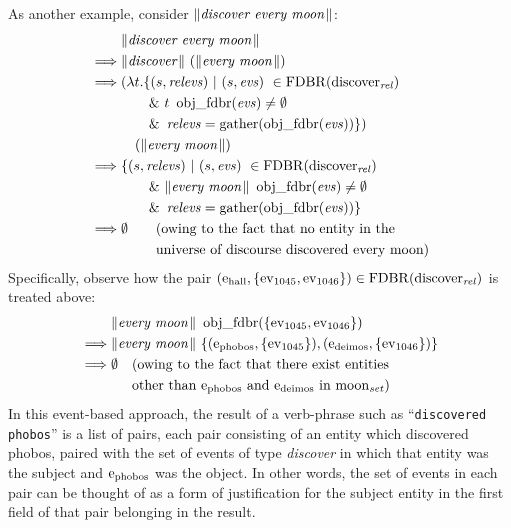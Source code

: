 \documentclass[../main.tex]{subfiles}
\begin{document}
\begin{refsection}
As another example, consider $\lVert\textit{discover every moon\hspace{0.1em}}\rVert$:
\begin{equation*}
	\begin{split}
		& \meaningof{discover every moon} \\
		\implies & \meaningof{discover}\ (\meaningof{every moon}) \\
		\implies & (\lambda t.\{(s, \opit{relevs})\ |\ (s, \evs)\ \in \FDBR{\relation{discover}}\ \\
		& \qquad \&\ t\ \objfdbr{\evs} \neq \emptyset  \\
		& \qquad \&\ \opit{relevs} = \gatherevs{\objfdbr{\evs}}\})\ \\
		& \quad (\meaningof{every moon}) \\
		\implies & \{(s, \opit{relevs})\ |\ (s, \evs)\ \in \FDBR{\relation{discover}}\ \\
		& \qquad \&\ \meaningof{every moon}\ \objfdbr{\evs} \neq \emptyset \\
		& \qquad \&\ \opit{relevs} = \gatherevs{\objfdbr{\evs}} \} \\
		\implies & \emptyset \qquad(\dmathrm{owing to the fact that no entity in the} \\
		\phantom{\implies} & \phantom{\emptyset} \qquad \dmathrm{universe of discourse discovered every moon})
	\end{split}
\end{equation*}
Specifically, observe how the pair $(\mathrm{e}_{\operatorname{\operatorname{hall}}}, \{ \operatorname{ev}_{1045}, \operatorname{ev}_{1046} \}) \in \operatorname{FDBR}({\operatorname{discover}_{\operatorname{\mathit{rel}}}})$ is treated above:
\begin{equation*}
	\begin{split}
		&\meaningof{every moon}\ \objfdbr{\{\eventassoc{1045}, \eventassoc{1046}\}} \\
		\implies & \meaningof{every moon}\ \{(\entityassoc{phobos}, \{\eventassoc{1045}\}), (\entityassoc{deimos}, \{\eventassoc{1046}\})\} \\
		\implies & \emptyset \quad (\dmathrm{owing to the fact that there exist entities}\ \\
		\phantom{\implies}	& \phantom{\emptyset} \quad \dmathrm{other than $\entity{phobos}$ and\ $\entity{deimos}$ in\ $\wordset{moon}$})
	\end{split}
\end{equation*}
In this event-based approach, the result of a verb-phrase such as ``\texttt{discovered phobos}'' is a list
of pairs, each pair consisting of an entity which discovered phobos, paired with the set of events of
type {\em discover} in which that entity was the subject and $\mathrm{e}_{\operatorname{phobos}}$ was the object.
In other words, the set of events in each pair can be thought of as a form of justification for the subject entity in the first field of that pair belonging in the result.


\end{refsection}
\end{document}
